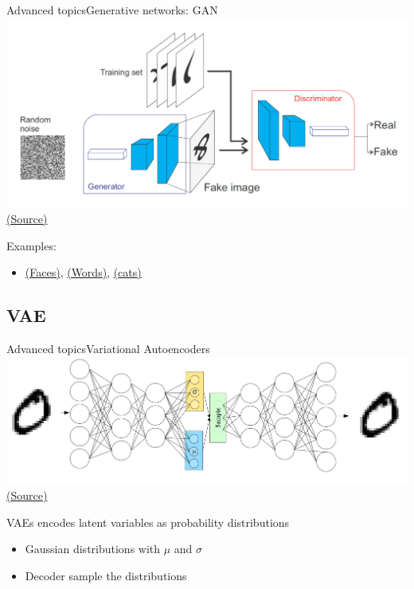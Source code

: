 \documentclass[10pt,compress]{beamer} %
\begin{document}
\begin{frame}{Advanced topics}{Generative networks: GAN}
	\centering\includegraphics[width=0.7\linewidth]{figs/gan.png}\\
	\scriptsize\href{https://www.oreilly.com/library/view/java-deep-learning/9781788997454/60579068-af4b-4bbf-83f1-e988fbe3b226.xhtml}{(Source)}\\

    \normalsize
    \begin{flushleft}
   Examples:\\
    \begin{itemize}
        \item \href{https://thispersondoesnotexist.com/}{(Faces)}, \href{http://www.thisworddoesnotexist.com/}{(Words)}, \href{https://thesecatsdonotexist.com/}{(cats)}
    \end{itemize}
    \end{flushleft}
\end{frame}


\subsection{VAE}
\begin{frame}{Advanced topics}{Variational Autoencoders}
	\centering\includegraphics[width=0.85\linewidth]{figs/vae.png}\\
	\scriptsize\href{https://towardsdatascience.com/intuitively-understanding-variational-autoencoders-1bfe67eb5daf}{(Source)}

	\bigskip

	\flushleft
	\normalsize

	VAEs encodes latent variables as probability distributions
	\begin{itemize}
		\item Gaussian distributions with $\mu$ and $\sigma$
		\item Decoder sample the distributions
	\end{itemize}
\end{frame}
\end{document}
